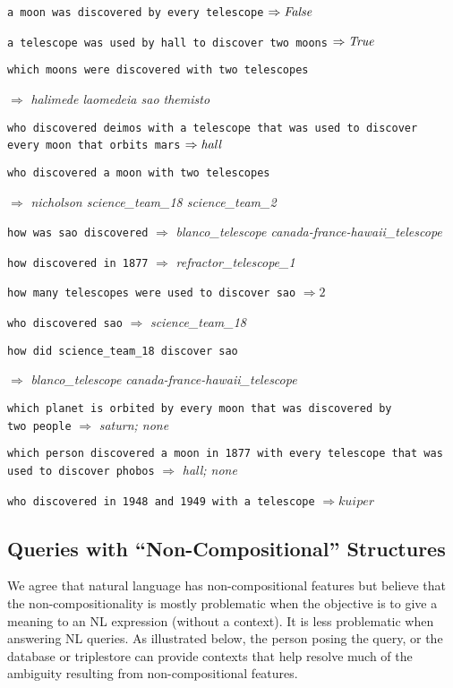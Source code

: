 \documentclass[../main.tex]{subfiles}
\begin{document}
\begin{refsection}
\noindent \texttt{a moon was discovered by every telescope} $\Rightarrow \mathit{False}$

\noindent \texttt{a telescope was used by hall to discover two moons} $\Rightarrow \mathit{True}$

\noindent \texttt{which moons were discovered with two telescopes}

$\Rightarrow$ \textit{halimede laomedeia sao themisto}

\noindent \texttt{who discovered deimos with a telescope that was used to discover \\ every moon that orbits mars} $\Rightarrow \mathit{hall}$

\noindent \texttt{who discovered a moon with two telescopes}

$\Rightarrow$ \textit{nicholson science\_team\_18 science\_team\_2}

\noindent \texttt{how was sao discovered} $\Rightarrow$ \textit{blanco\_telescope canada-france-hawaii\_telescope}

\noindent \texttt{how discovered in 1877} $\Rightarrow$ \textit{refractor\_telescope\_1}

\noindent \texttt{how many telescopes were used to discover sao} $\Rightarrow 2$

\noindent \texttt{who discovered sao}  $\Rightarrow$ \textit{science\_team\_18}

\noindent \texttt{how did science\_team\_18 discover sao}

$\Rightarrow$ \textit{blanco\_telescope canada-france-hawaii\_telescope}

\noindent \texttt{which planet is orbited by every moon that was discovered by \\ two people}
$\Rightarrow$ \textit{saturn; none}

\noindent \texttt{which person discovered a moon in 1877 with every telescope that was used to discover phobos} $\Rightarrow$ \textit{hall; none}

\noindent \texttt{who discovered in 1948 and 1949 with a telescope} $\Rightarrow \mathit{kuiper}$

\subsection{Queries with ``Non-Compositional'' Structures}
\label{webist2019conf:noncompositional}

We agree that natural language has non-compositional features but believe that the non-compositionality is mostly problematic when the objective is to give a meaning to an NL expression (without a context). It is less problematic when answering NL queries. As illustrated below, the person posing the query, or the database or triplestore can provide contexts that help resolve much of the ambiguity resulting from non-compositional features.


\end{refsection}
\end{document}
